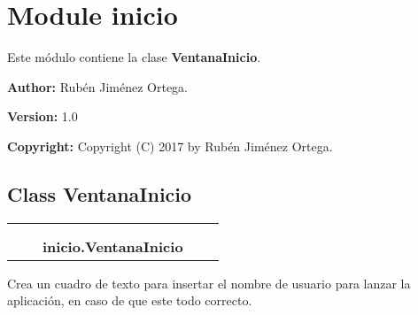 %
%
%


\section{Module inicio}

    \label{inicio}
Este módulo contiene la clase \textbf{VentanaInicio}.

\textbf{Author:} Rubén Jiménez Ortega.



\textbf{Version:} 1.0



\textbf{Copyright:} Copyright (C) 2017 by Rubén Jiménez Ortega.





\subsection{Class VentanaInicio}

    \label{inicio:VentanaInicio}
\begin{tabular}{cccccc}
\multicolumn{2}{r}{\settowidth{\BCL}{??-7}\multirow{2}{\BCL}{??-7}}
&&
  \\\cline{3-3}
  &&\multicolumn{1}{c|}{}
&&
  \\
&&\multicolumn{2}{l}{\textbf{inicio.VentanaInicio}}
\end{tabular}

Crea un cuadro de texto para insertar el nombre de usuario para lanzar la 
aplicación, en caso de que este todo correcto.



